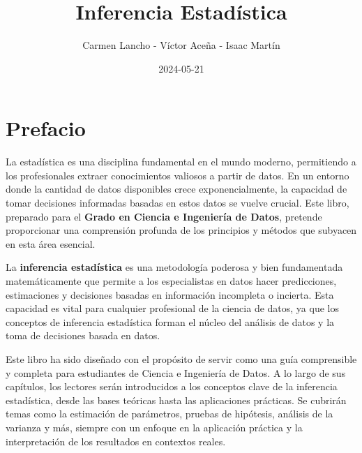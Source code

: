 \documentclass[
  letterpaper,
  DIV=11,
  numbers=noendperiod]{scrreprt}
\title{Inferencia Estadística}
\author{Carmen Lancho - Víctor Aceña - Isaac Martín}
\date{2024-05-21}
\renewcommand*\contentsname{Table of contents}
\newcommand\contentsname{Table of contents}
\begin{document}
\maketitle
\ifdefined\Shaded\renewenvironment{Shaded}{\begin{tcolorbox}[enhanced, borderline west={3pt}{0pt}{shadecolor}, breakable, frame hidden, boxrule=0pt, interior hidden, sharp corners]}{\end{tcolorbox}}\fi

\renewcommand*\contentsname{Table of contents}
{
\hypersetup{linkcolor=}
\setcounter{tocdepth}{2}
\tableofcontents
}

\hypertarget{prefacio}{%
\chapter*{Prefacio}\label{prefacio}}


La estadística es una disciplina fundamental en el mundo moderno,
permitiendo a los profesionales extraer conocimientos valiosos a partir
de datos. En un entorno donde la cantidad de datos disponibles crece
exponencialmente, la capacidad de tomar decisiones informadas basadas en
estos datos se vuelve crucial. Este libro, preparado para el
\textbf{Grado en Ciencia e Ingeniería de Datos}, pretende proporcionar
una comprensión profunda de los principios y métodos que subyacen en
esta área esencial.

La \textbf{inferencia estadística} es una metodología poderosa y bien
fundamentada matemáticamente que permite a los especialistas en datos
hacer predicciones, estimaciones y decisiones basadas en información
incompleta o incierta. Esta capacidad es vital para cualquier
profesional de la ciencia de datos, ya que los conceptos de inferencia
estadística forman el núcleo del análisis de datos y la toma de
decisiones basada en datos.

Este libro ha sido diseñado con el propósito de servir como una guía
comprensible y completa para estudiantes de Ciencia e Ingeniería de
Datos. A lo largo de sus capítulos, los lectores serán introducidos a
los conceptos clave de la inferencia estadística, desde las bases
teóricas hasta las aplicaciones prácticas. Se cubrirán temas como la
estimación de parámetros, pruebas de hipótesis, análisis de la varianza
y más, siempre con un enfoque en la aplicación práctica y la
interpretación de los resultados en contextos reales.
\end{document}

